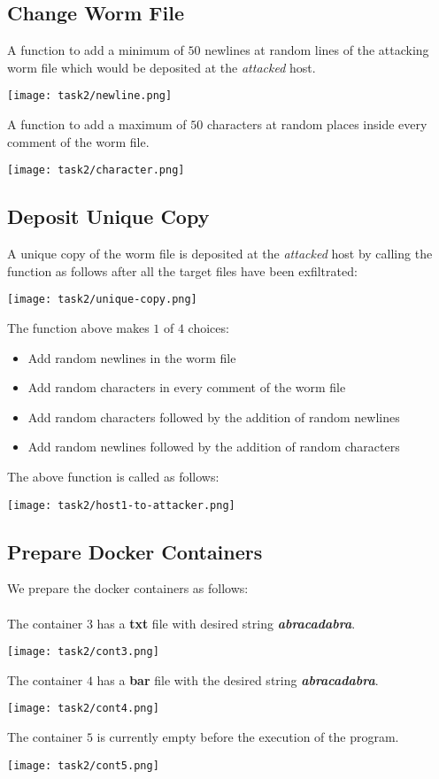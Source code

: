 \documentclass{article}
\begin{document}
 \subsection{Change Worm File}
 A function to add a minimum of $50$ newlines at random lines of the attacking worm file which would be deposited at the \textit{attacked} host.
 \begin{center}
    \texttt{[image: task2/newline.png]}
\end{center}

A function to add a maximum of $50$ characters at random places inside every comment of the worm file.
\begin{center}
    \texttt{[image: task2/character.png]}
\end{center}

\subsection{Deposit Unique Copy}
A unique copy of the worm file is deposited at the \textit{attacked} host by calling the function as follows after all the target files have been exfiltrated:
\begin{center}
    \texttt{[image: task2/unique-copy.png]}
\end{center}

The function above makes $1$ of $4$ choices:
\begin{itemize}
    \item Add random newlines in the worm file
    \item Add random characters in every comment of the worm file
    \item Add random characters followed by the addition of random newlines
    \item Add random newlines followed by the addition of random characters
\end{itemize}

The above function is called as follows:
\begin{center}
    \texttt{[image: task2/host1-to-attacker.png]}
\end{center}

\subsection{Prepare Docker Containers}
We prepare the docker containers as follows:\\\\
The container $3$ has a \textbf{txt} file with desired string \textbf{\textit{abracadabra}}.
\begin{center}
    \texttt{[image: task2/cont3.png]}
\end{center}
The container $4$ has a \textbf{bar} file with the desired string \textbf{\textit{abracadabra}}.
\begin{center}
    \texttt{[image: task2/cont4.png]}
\end{center}
The container $5$ is currently empty before the execution of the program.
\begin{center}
    \texttt{[image: task2/cont5.png]}
\end{center}
\end{document}

